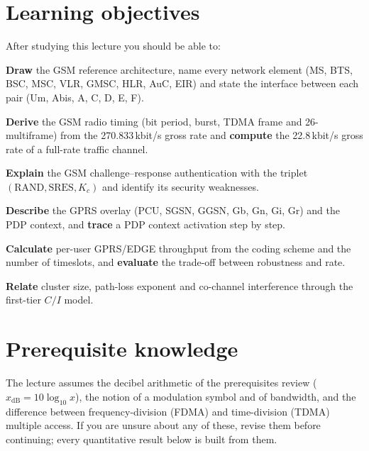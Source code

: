 \documentclass[11pt,a4paper]{article}
\begin{document}
\ACNcover

\section{Learning objectives}\label{sec:objectives}
After studying this lecture you should be able to:
\begin{objectives}
  \item \textbf{Draw} the GSM reference architecture, name every network element
        (MS, BTS, BSC, MSC, VLR, GMSC, HLR, AuC, EIR) and state the interface
        between each pair (Um, Abis, A, C, D, E, F).
  \item \textbf{Derive} the GSM radio timing (bit period, burst, TDMA frame and
        26-multiframe) from the 270.833\,kbit/s gross rate and \textbf{compute}
        the 22.8\,kbit/s gross rate of a full-rate traffic channel.
  \item \textbf{Explain} the GSM challenge--response authentication with the
        triplet $(\text{RAND},\text{SRES},K_c)$ and identify its security weaknesses.
  \item \textbf{Describe} the GPRS overlay (PCU, SGSN, GGSN, Gb, Gn, Gi, Gr) and the
        PDP context, and \textbf{trace} a PDP context activation step by step.
  \item \textbf{Calculate} per-user GPRS/EDGE throughput from the coding scheme and the
        number of timeslots, and \textbf{evaluate} the trade-off between robustness and rate.
  \item \textbf{Relate} cluster size, path-loss exponent and co-channel interference
        through the first-tier $C/I$ model.
\end{objectives}

\section{Prerequisite knowledge}\label{sec:prereq}
The lecture assumes the decibel arithmetic of the prerequisites review
($x_{\mathrm{dB}} = 10\log_{10}x$), the notion of a modulation symbol and of
bandwidth, and the difference between frequency-division (FDMA) and time-division
(TDMA) multiple access. If you are unsure about any of these, revise them before
continuing; every quantitative result below is built from them.
\end{document}
